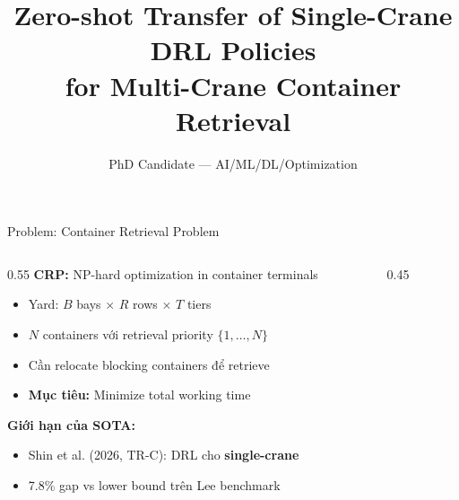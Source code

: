 \documentclass[aspectratio=169,11pt]{beamer}
\title{Zero-shot Transfer of Single-Crane DRL Policies \\ for Multi-Crane Container Retrieval}
\author{PhD Candidate --- AI/ML/DL/Optimization}
\date{}
\begin{document}
\maketitle

\begin{frame}{Problem: Container Retrieval Problem}
\begin{columns}
\begin{column}{0.55\textwidth}
\textbf{CRP:} NP-hard optimization in container terminals
\begin{itemize}
    \item Yard: $B$ bays $\times$ $R$ rows $\times$ $T$ tiers
    \item $N$ containers với retrieval priority $\{1,\dots,N\}$
    \item Cần relocate blocking containers để retrieve
    \item \textbf{Mục tiêu:} Minimize total working time
\end{itemize}

\vspace{0.5cm}
\textbf{Giới hạn của SOTA:}
\begin{itemize}
    \item Shin et al. (2026, TR-C): DRL cho \textbf{single-crane}
    \item 7.8\% gap vs lower bound trên Lee benchmark
\end{itemize}
\end{column}
\begin{column}{0.45\textwidth}
\centering
{}
\end{column}
\end{columns}
\end{frame}
\end{document}

